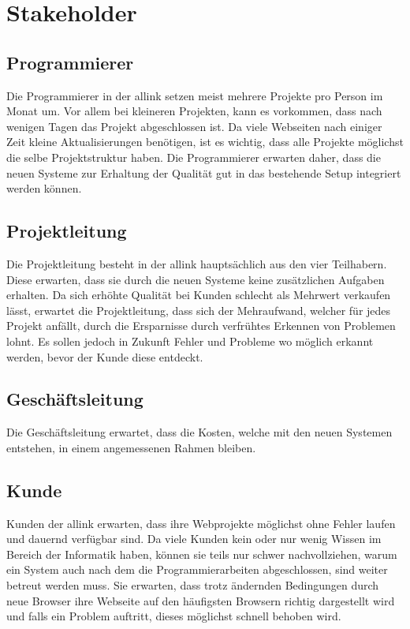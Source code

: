 \section{Stakeholder}
\label{sec:stakeholder}


\subsection{Programmierer}
\label{sub:programmierer}
Die Programmierer in der allink setzen meist mehrere Projekte pro Person im Monat um. Vor allem bei kleineren Projekten, kann es vorkommen, dass nach wenigen Tagen das Projekt abgeschlossen ist. Da viele Webseiten nach einiger Zeit kleine Aktualisierungen benötigen, ist es wichtig, dass alle Projekte möglichst die selbe Projektstruktur haben. Die Programmierer erwarten daher, dass die neuen Systeme zur Erhaltung der Qualität gut in das bestehende Setup integriert werden können.

\subsection{Projektleitung}
\label{sub:projektleitung}
Die Projektleitung besteht in der allink hauptsächlich aus den vier Teilhabern. Diese erwarten, dass sie durch die neuen Systeme keine zusätzlichen Aufgaben erhalten. Da sich erhöhte Qualität bei Kunden schlecht als Mehrwert verkaufen lässt, erwartet die Projektleitung, dass sich der Mehraufwand, welcher für jedes Projekt anfällt, durch die Ersparnisse durch verfrühtes Erkennen von Problemen lohnt. Es sollen jedoch in Zukunft Fehler und Probleme wo möglich erkannt werden, bevor der Kunde diese entdeckt.

\subsection{Geschäftsleitung}
\label{sub:geschäftsleitung}
Die Geschäftsleitung erwartet, dass die Kosten, welche mit den neuen Systemen entstehen, in einem angemessenen Rahmen bleiben.

\subsection{Kunde}
\label{sub:kunde}
Kunden der allink erwarten, dass ihre Webprojekte möglichst ohne Fehler laufen und dauernd verfügbar sind. Da viele Kunden kein oder nur wenig Wissen im Bereich der Informatik haben, können sie teils nur schwer nachvollziehen, warum ein System auch nach dem die Programmierarbeiten abgeschlossen, sind weiter betreut werden muss. Sie erwarten, dass trotz ändernden Bedingungen durch neue Browser ihre Webseite auf den häufigsten Browsern richtig dargestellt wird und falls ein Problem auftritt, dieses möglichst schnell behoben wird.

